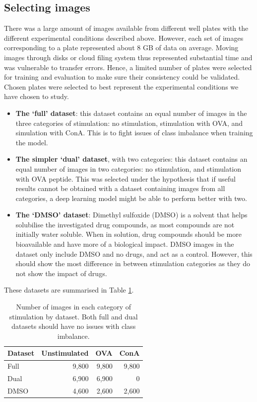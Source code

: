 \subsection{Selecting images} \label{subsec:selecting_dataset}

There was a large amount of images available from different well plates with the different experimental conditions described above. However, each set of images corresponding to a plate represented about 8 GB of data on average. Moving images through disks or cloud filing system thus represented substantial time and was vulnerable to transfer errors. Hence, a limited number of plates were selected for training and evaluation to make sure their consistency could be validated. Chosen plates were selected to best represent the experimental conditions we have chosen to study.

\begin{itemize}
    \item \textbf{The `full' dataset}: this dataset contains an equal number of images in the three categories of stimulation: no stimulation, stimulation with OVA, and simulation with ConA. This is to fight issues of class imbalance when training the model.
    \item \textbf{The simpler `dual' dataset}, with two categories: this dataset contains an equal number of images in two categories: no stimulation, and stimulation with OVA peptide. This was selected under the hypothesis that if useful results cannot be obtained with a dataset containing images from all categories, a deep learning model might be able to perform better with two.
    \item \textbf{The `DMSO' dataset}: Dimethyl sulfoxide (DMSO) is a solvent that helps solubilise the investigated drug compounds, as most compounds are not initially water soluble. When in solution, drug compounds should be more bioavailable and have more of a biological impact. DMSO images in the dataset only include DMSO and no drugs, and act as a control. However, this should show the most difference in between stimulation categories as they do not show the impact of drugs.
\end{itemize}

These datasets are summarised in Table \ref{table:datasets}.

\begin{table}[h]
\centering
\caption{Number of images in each category of stimulation by dataset. Both full and dual datasets should have no issues with class imbalance.}
\begin{tabular}{|l|r|r|r|}
\rowcolor[HTML]{EFEFEF}
\hline
Dataset & Unstimulated & OVA & ConA \\ \hline
Full    & 9,800        & 9,800 & 9,800    \\
Dual    & 6,900        & 6,900 & 0    \\
DMSO    & 4,600        & 2,600   & 2,600   \\ \hline
\end{tabular}
\label{table:datasets}
\end{table}

